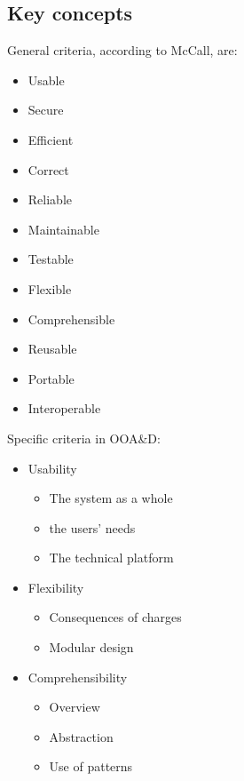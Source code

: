 \subsection{Key concepts}
General criteria, according to McCall, are:\\
\begin{minipage}[t]{\textwidth}
    \begin{minipage}[t]{.5\textwidth}
\begin{itemize}
    \item Usable
    \item Secure
    \item Efficient
    \item Correct
    \item Reliable
    \item Maintainable
    \item Testable
    \item Flexible
    \item Comprehensible
    \item Reusable
    \item Portable
    \item Interoperable
\end{itemize}
\end{minipage}%
    \begin{minipage}[t]{.5\textwidth}
Specific criteria in OOA\&D:
\begin{itemize}
    \item Usability
    \begin{itemize}
        \item The system as a whole
        \item the users' needs
        \item The technical platform
    \end{itemize}
    \item Flexibility
    \begin{itemize}
        \item Consequences of charges
        \item Modular design
    \end{itemize}
    \item Comprehensibility
    \begin{itemize}
        \item Overview
        \item Abstraction
        \item Use of patterns
    \end{itemize}
\end{itemize}
    \end{minipage}
\end{minipage}

